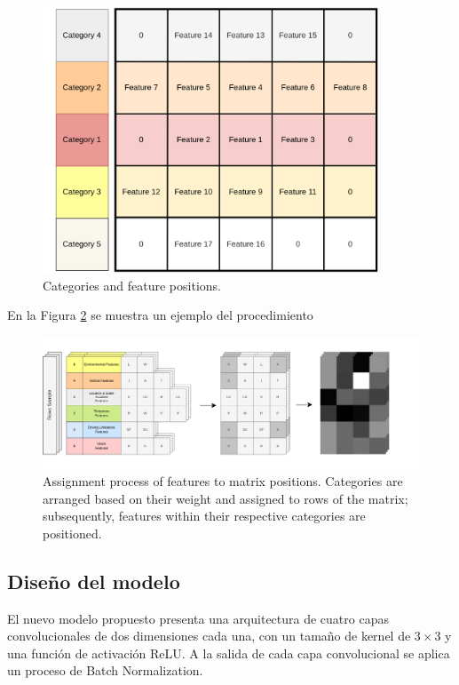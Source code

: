 \documentclass{uathesis-es}
\begin{document}
\begin{figure}[H]
    \centering
    \includegraphics[width=10cm]{Figures/indexing_positions_2.png}
    \caption{Categories and feature positions.}
    \label{MatrixIndexes}
\end{figure}

En la Figura \ref{MatrixConstruction} se muestra un ejemplo del procedimiento 

\begin{figure}[H]
    \centering
    \includegraphics[width=17cm]{Figures/Matrix Construction_2.png}
    \caption{Assignment process of features to matrix positions. Categories are arranged based on their weight and assigned to rows of the matrix; subsequently, features within their respective categories are positioned.}
    \label{MatrixConstruction}
\end{figure}

\subsection{Diseño del modelo}

El nuevo modelo propuesto presenta una arquitectura de cuatro capas convolucionales de dos dimensiones cada una, con un tamaño de kernel de $3 \times 3$ y una función de activación ReLU. A la salida de cada capa convolucional se aplica un proceso de Batch Normalization.
\end{document}
